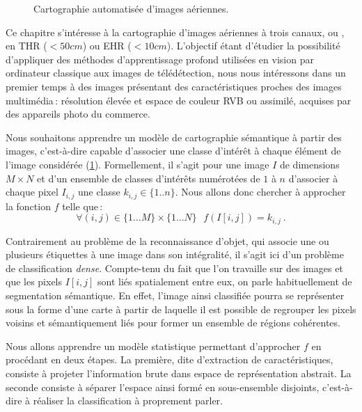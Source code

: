 \begin{figure}[t]
	\resizebox{\textwidth}{!}{}
	\caption{Cartographie automatisée d'images aériennes.}
	\label{fig:semantic_mapping}
\end{figure}

Ce chapitre s'intéresse à la cartographie d'images aériennes à trois canaux,  ou , en \gls{THR} ($<50cm$) ou \gls{EHR} ($<10cm$). L'objectif étant d'étudier la possibilité d'appliquer des méthodes d'apprentissage profond utilisées en vision par ordinateur classique aux images de télédétection, nous nous intéressons dans un premier temps à des images présentant des caractéristiques proches des images multimédia\,: résolution élevée et espace de couleur \gls{RVB} ou assimilé, acquises par des appareils photo du commerce.

Nous souhaitons apprendre un modèle de cartographie sémantique à partir des images, c'est-à-dire capable d'associer une classe d'intérêt à chaque élément de l'image considérée (\cref{fig:semantic_mapping}). Formellement, il s'agit pour une image $I$ de dimensions $M \times N$ et d'un ensemble de classes d'intérêts numérotées de $1$ à $n$ d'associer à chaque pixel $I_{i,j}$ une classe $k_{i,j} \in \{1..n\}$. Nous allons donc chercher à approcher la fonction $f$ telle que\,:
\begin{equation}
	\forall (i,j) \in \{1\dots{}M\}\times\{1\dots{}N\}~~~f(I[i,j]) = k_{i,j}~.
\end{equation}

Contrairement au problème de la reconnaissance d'objet, qui associe une ou plusieurs étiquettes à une image dans son intégralité, il s'agit ici d'un problème de classification \emph{dense}. Compte-tenu du fait que l'on travaille sur des images et que les pixels $I[i,j]$ sont liés spatialement entre eux, on parle habituellement de segmentation sémantique. En effet, l'image ainsi classifiée pourra se représenter sous la forme d'une carte à partir de laquelle il est possible de regrouper les pixels voisins et sémantiquement liés pour former un ensemble de régions cohérentes.

Nous allons apprendre un modèle statistique permettant d'approcher $f$ en procédant en deux étapes. La première, dite d'extraction de caractéristiques, consiste à projeter l'information brute dans espace de représentation abstrait. La seconde consiste à séparer l'espace ainsi formé en sous-ensemble disjoints, c'est-à-dire à réaliser la classification à proprement parler.


